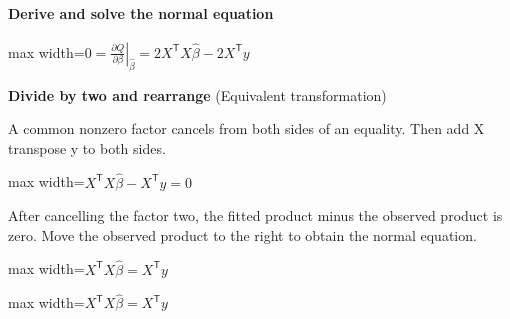 \documentclass[11pt,a4paper]{article}
\begin{document}
\paragraph{Derive and solve the normal equation}
\begin{center}\begin{adjustbox}{max width=\linewidth}$\displaystyle 0=\left.\frac{\partial Q}{\partial\beta}\right|_{\widehat\beta}=2X^{\mathsf T}X\widehat\beta-2X^{\mathsf T}y$\end{adjustbox}\end{center}
\noindent\textbf{Divide by two and rearrange} (Equivalent transformation)\par
A common nonzero factor cancels from both sides of an equality. Then add X transpose y to both sides.
\begin{center}\begin{adjustbox}{max width=\linewidth}$\displaystyle X^{\mathsf T}X\widehat\beta-X^{\mathsf T}y=0$\end{adjustbox}\end{center}

After cancelling the factor two, the fitted product minus the observed product is zero. Move the observed product to the right to obtain the normal equation.
\begin{center}\begin{adjustbox}{max width=\linewidth}$\displaystyle X^{\mathsf T}X\widehat\beta=X^{\mathsf T}y$\end{adjustbox}\end{center}


\begin{center}\begin{adjustbox}{max width=\linewidth}$\displaystyle X^{\mathsf T}X\widehat\beta=X^{\mathsf T}y$\end{adjustbox}\end{center}
\end{document}
